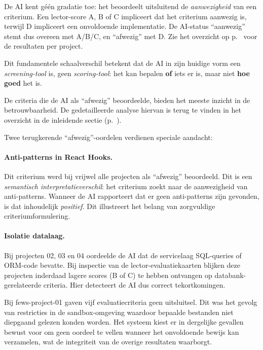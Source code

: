 \noindent De AI kent géén gradatie toe: het beoordeelt uitsluitend de \textit{aanwezigheid} van een criterium. Een lector-score A, B of C impliceert dat het criterium aanwezig is, terwijl D impliceert een onvoldoende implementatie. De AI-status ``aanwezig'' stemt dus overeen met A/B/C, en ``afwezig'' met D. Zie het overzicht op p.~\pageref{tab:eval-overview} voor de resultaten per project.

\vspace{1em}

Dit fundamentele schaalverschil betekent dat de AI in zijn huidige vorm een \textit{screening-tool} is, geen \textit{scoring-tool}: het kan bepalen \textbf{of} iets er is, maar niet \textbf{hoe goed} het is.

De criteria die de AI als ``afwezig'' beoordeelde, bieden het meeste inzicht in de betrouwbaarheid. De gedetailleerde analyse hiervan is terug te vinden in het overzicht in de inleidende sectie (p.~\pageref{tab:afwezig-analyse}).

Twee terugkerende ``afwezig''-oordelen verdienen speciale aandacht:

\paragraph{Anti-patterns in React Hooks.} Dit criterium werd bij vrijwel alle projecten als ``afwezig'' beoordeeld. Dit is een \textit{semantisch interpretatieverschil}: het criterium zoekt naar de aanwezigheid van anti-patterns. Wanneer de AI rapporteert dat er geen anti-patterns zijn gevonden, is dat inhoudelijk \textit{positief}. Dit illustreert het belang van zorgvuldige criteriumformulering.

\paragraph{Isolatie datalaag.} Bij projecten 02, 03 en 04 oordeelde de AI dat de servicelaag SQL-queries of ORM-code bevatte. Bij inspectie van de lector-evaluatiekaarten blijken deze projecten inderdaad lagere scores (B of C) te hebben ontvangen op databank-gerelateerde criteria. Hier detecteert de AI dus correct tekortkomingen.

\vspace{1em}

Bij fews-project-01 gaven vijf evaluatiecriteria geen uitsluitsel. Dit was het gevolg van restricties in de sandbox-omgeving waardoor bepaalde bestanden niet diepgaand gelezen konden worden. Het systeem kiest er in dergelijke gevallen bewust voor om geen oordeel te vellen wanneer het onvoldoende bewijs kan verzamelen, wat de integriteit van de overige resultaten waarborgt.


